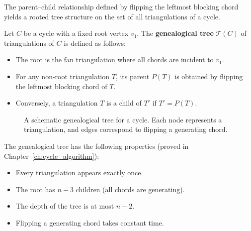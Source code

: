 The parent–child relationship defined by flipping the leftmost blocking chord yields a rooted tree structure on the set of all triangulations of a cycle.

\begin{definition}
    \label{def:genealogical_tree}
    Let \(C\) be a cycle with a fixed root vertex \(v_1\). 
    The \textbf{genealogical tree} \(\mathcal{T}(C)\) of triangulations of \(C\) is defined as follows:
    \begin{itemize}
        \item The root is the fan triangulation where all chords are incident to \(v_1\).
        \item For any non-root triangulation \(T\), its parent \(P(T)\) is obtained by flipping the leftmost blocking chord of \(T\).
        \item Conversely, a triangulation \(T\) is a child of \(T'\) if \(T' = P(T)\).
    \end{itemize}
\end{definition}

\begin{figure}[htbp]
    \centering
    \caption{A schematic genealogical tree for a cycle. Each node represents a triangulation, and edges correspond to flipping a generating chord.}
    \label{fig:genealogical_tree}
\end{figure}

The genealogical tree has the following properties (proved in Chapter~\ref{ch:cycle_algorithm}):
\begin{itemize}
    \item Every triangulation appears exactly once.
    \item The root has \(n-3\) children (all chords are generating).
    \item The depth of the tree is at most \(n-2\).
    \item Flipping a generating chord takes constant time.
\end{itemize}

